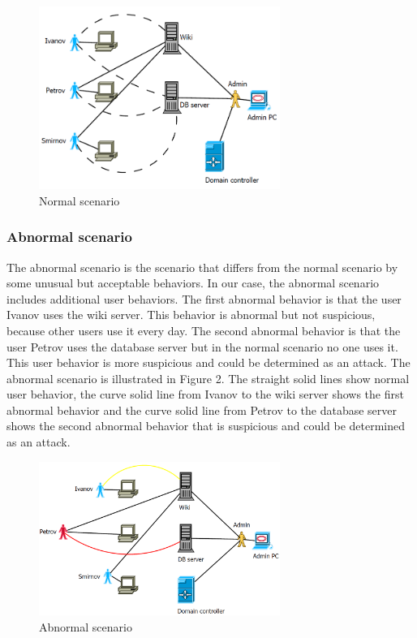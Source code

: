\begin{figure}[ht!]
\centering
\includegraphics[width=0.7\textwidth]{scenario_normal.png}
\caption{Normal scenario}
\label{overflow}
\end{figure}

\subsubsection{Abnormal scenario}
The abnormal scenario is the scenario that differs from the normal scenario by some unusual but acceptable behaviors. In our case, the abnormal scenario includes additional user behaviors. The first abnormal behavior is that the user Ivanov uses the wiki server. This behavior is abnormal but not suspicious, because other users use it every day. The second abnormal behavior is that the user Petrov uses the database server but in the normal scenario no one uses it. This user behavior is more suspicious and could be determined as an attack. The abnormal scenario is illustrated in Figure 2. The straight solid lines show normal user behavior, the curve solid line from Ivanov to the wiki server shows the first abnormal behavior and the curve solid line from Petrov to the database server shows the second abnormal behavior that is suspicious and could be determined as an attack. 
\begin{figure}[ht!]
\centering
\includegraphics[width=0.7\textwidth]{scenario_abnormal.png}
\caption{Abnormal scenario}
\label{overflow}
\end{figure}

